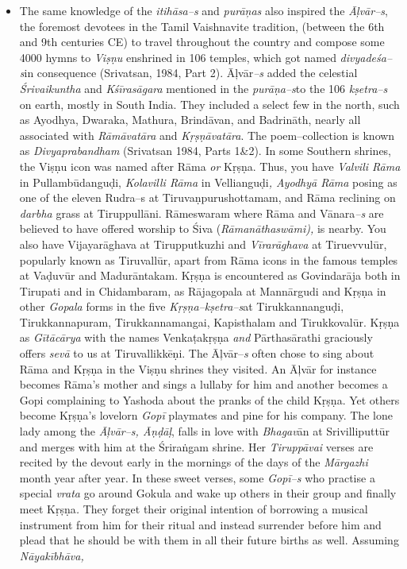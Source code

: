 \begin{itemize}
\item The same knowledge of the \textit{itihāsa–s} and \textit{purāņas} also inspired the \textit{Āļvār–s}, the foremost devotees in the Tamil Vaishnavite tradition, (between the 6th and 9th centuries CE) to travel throughout the country and compose some 4000 hymns to \textit{Viṣṇu} enshrined in 106 temples, which got named \textit{divyadeśa–s}\break in consequence (Srivatsan, 1984, Part 2). Āļvār\textit{–s} added the celestial \textit{Śrivaikuntha} and \textit{Kśīrasāgara} mentioned in the \textit{purāṇa–s}\break to the 106 \textit{kṣetra–s} on earth, mostly in South India. They included a select few in the north, such as Ayodhya, Dwaraka, Mathura, Brindāvan, and Badrināth, nearly all associated with \textit{Rāmāvatāra} and \textit{Kṛṣṇāvatāra}. The poem–collection is known as \textit{Divyaprabandham} (Srivatsan 1984, Parts 1\&2). In some Southern shrines, the Viṣṇu icon was named after Rāma\textit{ or} Kṛṣṇa. Thus, you have \textit{Valvili Rāma} in Pullambūdanguḍi, \textit{Kolavilli Rāma} in Vellianguḍi\textit{, Ayodhyā Rāma} posing as one of the eleven Rudra–s at Tiruvaṇpurushottamam, and Rāma reclining on \textit{darbha} grass at Tiruppullāni. Rāmeswaram where Rāma and Vānara\textit{–s} are believed to have offered worship to Śiva (\textit{Rāmanāthaswāmi),} is nearby. You also have Vijayarāghava at Tirupputkuzhi and \textit{Vīrarāghava} at Tiruevvulūr, popularly known as Tiruvallūr, apart from Rāma icons in the famous temples at Vaḍuvūr and Madurāntakam. Kṛṣṇa is encountered as Govindarāja both in Tirupati and in Chidambaram, as Rājagopala at Mannārgudi and Kṛṣṇa in other \textit{Gopala} forms in the five \textit{Kṛṣṇa–kṣetra–s}\break at Tirukkannanguḍi, Tirukkannapuram, Tirukkannamangai, Kapisthalam and Tirukkovalūr. Kṛṣṇa as \textit{Gītācārya} with the names Venkaṭakṛṣṇa\textit{ and} Pārthasārathi graciously offers \textit{sevā} to us at Tiruvallikkēṇi. The Āļvār–\textit{s} often chose to sing about Rāma and Kṛṣṇa in the Viṣṇu shrines they visited\textit{.} An Āļvār for instance becomes Rāma’s mother and sings a lullaby for him and another becomes a Gopi complaining to Yashoda about the pranks of the child Kṛṣṇa. Yet others become Kṛṣṇa’s lovelorn \textit{Gopī} playmates and pine for his company. The lone lady among the \textit{Āļvār–s, Āṇḍāḷ}, falls in love with \textit{Bhagav}ān at Srivilliputtūr and merges with him at the Śriraṅgam shrine. Her \textit{Tiruppāvai} verses are recited by the devout early in the mornings of the days of the \textit{Mārgazhi} month year after year. In these sweet verses, some \textit{Gopī–s} who practise a special \textit{vrata} go around Gokula and wake up others in their group and finally meet Kṛṣṇa\textit{.} They forget their original intention of borrowing a musical instrument from him for their ritual and instead surrender before him and plead that he should be with them in all their future births as well. Assuming \textit{Nāyakībhāva,} 
\end{itemize}
